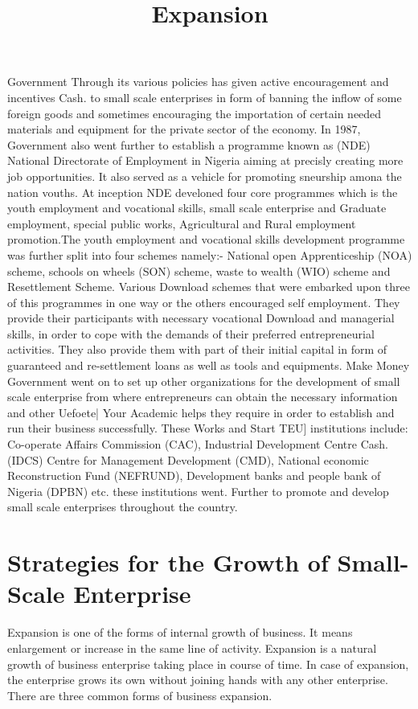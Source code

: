 \documentclass{article}
\begin{document}
Government Through its various policies has given active encouragement and incentives Cash.
to small scale enterprises in form of banning the inflow of some foreign goods and
sometimes encouraging the importation of certain needed materials and equipment for the
private sector of the economy. In 1987, Government also went further to establish a
programme known as (NDE) National Directorate of Employment in Nigeria aiming at
precisly creating more job opportunities. It also served as a vehicle for promoting
sneurship amona the nation vouths. At inception NDE develoned four core 
programmes which is the youth employment and vocational skills, small scale enterprise
and Graduate employment, special public works, Agricultural and Rural employment
promotion.The youth employment and vocational skills development programme was further split
into four schemes namely:- National open Apprenticeship (NOA) scheme, schools on
wheels (SON) scheme, waste to wealth (WIO) scheme and Resettlement Scheme. Various Download
schemes that were embarked upon three of this programmes in one way or the others
encouraged self employment. They provide their participants with necessary vocational Download
and managerial skills, in order to cope with the demands of their preferred entrepreneurial
activities. They also provide them with part of their initial capital in form of guaranteed
and re-settlement loans as well as tools and equipments. Make Money
Government went on to set up other organizations for the development of small scale
enterprise from where entrepreneurs can obtain the necessary information and other Uefoete| Your Academic
helps they require in order to establish and run their business successfully. These Works and Start TEU]
institutions include: Co-operate Affairs Commission (CAC), Industrial Development Centre Cash.
(IDCS) Centre for Management Development (CMD), National economic Reconstruction
Fund (NEFRUND), Development banks and people bank of Nigeria (DPBN) etc. these
institutions went. Further to promote and develop small scale enterprises throughout the country.

\section*{Strategies for the Growth of Small-Scale Enterprise}
\title{ Expansion}
Expansion is one of the forms of internal growth of business. It means enlargement or increase in the same line of activity.
 Expansion is a natural growth of business enterprise taking place in course of time. In case of expansion, the enterprise grows
  its own without joining hands with any other enterprise. There are three common forms of business expansion.
\end{document}
